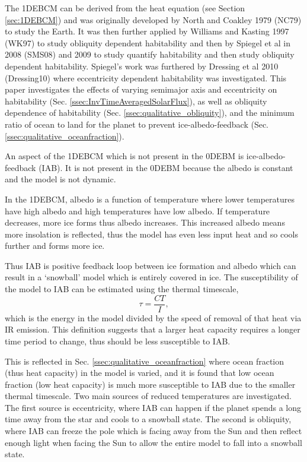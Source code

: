 \documentclass[12pt, onecolumn]{revtex4-2}    %
\begin{document}
The 1DEBCM can be derived from the heat equation (see Section \ref{sec:1DEBCM}) and was originally developed by North and Coakley 1979 (NC79) \cite{NC79} to study the Earth.
It was then further applied by Williams and Kasting 1997 (WK97) \cite{WK97} to study obliquity dependent habitability and then by Spiegel et al in 2008 (SMS08) \cite{SMS08} and 2009 \cite{SMS09} to study quantify habitability and then study obliquity dependent habitability.
Spiegel's work was furthered by Dressing et al 2010 (Dressing10) \cite{Dressing10} where eccentricity dependent habitability was investigated.
This paper investigates the effects of varying semimajor axis and eccentricity on habitability (Sec. \ref{ssec:InvTimeAveragedSolarFlux}), as well as obliquity dependence of habitability (Sec. \ref{ssec:qualitative_obliquity}), and the minimum ratio of ocean to land for the planet to prevent ice-albedo-feedback (Sec. \ref{ssec:qualitative_oceanfraction}).

%
An aspect of the 1DEBCM which is not present in the 0DEBM is ice-albedo-feedback (IAB).
It is not present in the 0DEBM because the albedo is constant and the model is not dynamic.

In the 1DEBCM, albedo is a function of temperature where lower temperatures have high albedo and high temperatures have low albedo.
If temperature decreases, more ice forms thus albedo increases.
This increased albedo means more insolation is reflected, thus the model has even less input heat and so cools further and forms more ice.

Thus IAB is positive feedback loop between ice formation and albedo which can result in a `snowball' model which is entirely covered in ice.
The susceptibility of the model to IAB can be estimated using the thermal timescale,
\begin{equation}
  \tau = \frac{C T}{I},
  \label{eq:ThermalTimescale}
\end{equation}
which is the energy in the model divided by the speed of removal of that heat via IR emission.
This definition suggests that a larger heat capacity requires a longer time period to change, thus should be less susceptible to IAB.

This is reflected in Sec. \ref{ssec:qualitative_oceanfraction} where ocean fraction (thus heat capacity) in the model is varied, and it is found that low ocean fraction (low heat capacity) is much more susceptible to IAB due to the smaller thermal timescale.
Two main sources of reduced temperatures are investigated.
The first source is eccentricity, where IAB can happen if the planet spends a long time away from the star and cools to a snowball state.
The second is obliquity, where IAB can freeze the pole which is facing away from the Sun and then reflect enough light when facing the Sun to allow the entire model to fall into a snowball state.
\end{document}
